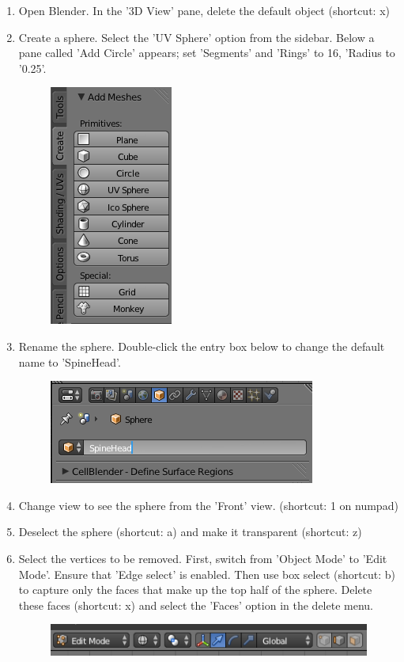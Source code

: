 \documentclass[twoside,a4paper]{refart}
\begin{document}
\begin{enumerate}

\item   Open Blender. In the '3D View' pane, delete the default object (shortcut: x)
    
\item   Create a sphere. Select the 'UV Sphere' option from the sidebar. Below a pane called 'Add Circle' appears; set 'Segments' and 'Rings' to 16, 'Radius to '0.25'. 
        \begin{figure}[H]
        \includegraphics[scale=0.5]{spinehead1.png}
        \end{figure}

\item   Rename the sphere. Double-click the entry box below to change the default name to 'SpineHead'.
        \begin{figure}[H]
        \includegraphics[scale=0.5]{spinehead2.png}
        \end{figure}

\item   Change view to see the sphere from the 'Front' view. (shortcut: 1 on numpad)

\item   Deselect the sphere (shortcut: a) and make it transparent (shortcut: z)

\item   Select the vertices to be removed. First, switch from 'Object Mode' to 'Edit Mode'. Ensure that 'Edge select' is enabled. Then use box select (shortcut: b) to capture only the faces that make up the top half of the sphere. Delete these faces (shortcut: x) and select the 'Faces' option in the delete menu.
        \begin{figure}[H]
        \includegraphics[scale=0.5]{spinehead3.png}
        \end{figure}


\end{enumerate}
\end{document}
